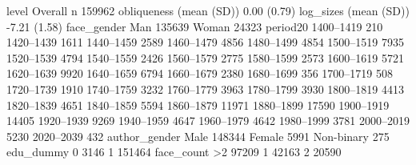                          
                          level      Overall     
  n                                  159962      
  obliqueness (mean (SD))            0.00 (0.79) 
  log_sizes (mean (SD))              -7.21 (1.58)
  face_gender             Man        135639      
                          Woman      24323       
  period20                1400–1419  210         
                          1420–1439  1611        
                          1440–1459  2589        
                          1460–1479  4856        
                          1480–1499  4854        
                          1500–1519  7935        
                          1520–1539  4794        
                          1540–1559  2426        
                          1560–1579  2775        
                          1580–1599  2573        
                          1600–1619  5721        
                          1620–1639  9920        
                          1640–1659  6794        
                          1660–1679  2380        
                          1680–1699  356         
                          1700–1719  508         
                          1720–1739  1910        
                          1740–1759  3232        
                          1760–1779  3963        
                          1780–1799  3930        
                          1800–1819  4413        
                          1820–1839  4651        
                          1840–1859  5594        
                          1860–1879  11971       
                          1880–1899  17590       
                          1900–1919  14405       
                          1920–1939  9269        
                          1940–1959  4647        
                          1960–1979  4642        
                          1980–1999  3781        
                          2000–2019  5230        
                          2020–2039  432         
  author_gender           Male       148344      
                          Female     5991        
                          Non-binary 275         
  edu_dummy               0          3146        
                          1          151464      
  face_count              >2         97209       
                          1          42163       
                          2          20590       
